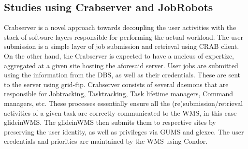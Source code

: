 \documentclass[a4paper]{jpconf}
\begin{document}
\subsection{Studies using Crabserver and JobRobots}
Crabserver is a novel approach towards decoupling the user activities with the stack of software
layers responsible for performing the actual workload. The user submission is a simple layer 
of job submission and retrieval using CRAB client. On the other hand, the Crabserver is expected 
to have a nucleus of expertize, aggregated at a given site hosting the aforesaid server. User jobs
are submitted using the information from the DBS, as well as their credentials.
These are sent to the server using grid-ftp. Crabserver consists of several daemons that are responsible 
for Jobtracking, Tasktracking, Task lifetime managers, Command managers, etc. These processes
essentially ensure all the (re)submission/retrieval activities of a given task are correctly communicated
to the WMS, in this case glideinWMS. The glideinWMS then submits them to respective sites 
by preserving the user identity, as well as privileges via GUMS and glexec. The user credentials
and priorities are maintained by the WMS using Condor.
\end{document}
